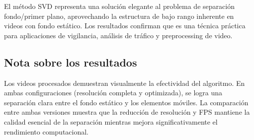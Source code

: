 \documentclass[12pt]{article}
\begin{document}
El método SVD representa una solución elegante al problema de separación fondo/primer plano, aprovechando la estructura de bajo rango inherente en videos con fondo estático. Los resultados confirman que es una técnica práctica para aplicaciones de vigilancia, análisis de tráfico y preprocessing de video.

\subsection{Nota sobre los resultados}

Los videos procesados demuestran visualmente la efectividad del algoritmo. En ambas configuraciones (resolución completa y optimizada), se logra una separación clara entre el fondo estático y los elementos móviles. La comparación entre ambas versiones muestra que la reducción de resolución y FPS mantiene la calidad esencial de la separación mientras mejora significativamente el rendimiento computacional.
\end{document}

